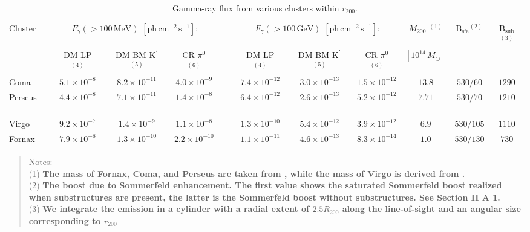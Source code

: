 \documentclass[10pt,aps,pra,reprint,amsmath,amsfonts,amssymb,showpacs,nofootinbib,floatfix]{revtex4-1}
\def\C#1{{\bf #1}}
\newcommand{\rmn}{\mathrm}
\newcommand{\msun}{M_\odot}
\newcommand{\Kp}{\rmn{K}^\prime}
\newcommand{\B}{\rmn{B}}
\newcommand{\rvir}{r_{200}}
\newcommand{\mvir}{M_{200}}
\begin{document}
\begin{table}
\begin{minipage}{2.0\columnwidth}
  \caption{Gamma-ray flux from various clusters within $\rvir$.}
\begin{tabular}{l  c c c  c  c c c c c c}
\hline
\hline
 Cluster &
\multicolumn{3}{c}{$F_{\gamma}(>100\,\rmn{MeV})$ $[\rmn{ph}\,\rmn{cm}^{-2}\,\rmn{s}^{-1}]$:} & &
\multicolumn{3}{c}{$F_{\gamma}(>100\,\rmn{GeV})$ $[\rmn{ph}\,\rmn{cm}^{-2}\,\rmn{s}^{-1}]$:} & 
$\mvir$ $^{(1)}$ & $\B_\rmn{sfe} $$^{(2)}$ &  $\B_\rmn{sub} $$^{(3)}$ \\
         & DM-LP $^{(4)}$ & DM-BM-$\Kp$ $^{(5)}$ & CR-$\pi^0$ $^{(6)}$ 
         & & DM-LP $^{(4)}$ & DM-BM-$\Kp$ $^{(5)}$ & CR-$\pi^0$ $^{(6)}$ & $[10^{14}\,\msun]$ &&  \\
 \hline
 Coma                 & $5.1\times10^{-8}$  & $8.2\times10^{-11}$ & $4.0\times10^{-9}$  
 & \,\,\,\,\,         & $7.4\times10^{-12}$ & $3.0\times10^{-13}$ & $1.5\times10^{-12}$ 
 & $13.8$ & $530/60$  & $1290$ \\
 Perseus \,\,\,\,\,\, & $4.4\times10^{-8}$  & $7.1\times10^{-11}$ & $1.4\times10^{-8}$  
 & \,\,\,\,\,         & $6.4\times10^{-12}$ & $2.6\times10^{-13}$ & $5.2\times10^{-12}$ 
 & $7.71$ & $530/70$  & $1210$ \\
 Virgo                & $9.2\times10^{-7}$  & $1.4\times10^{-9}$ & $1.1\times10^{-8}$  
 & \,\,\,\,\,         & $1.3\times10^{-10}$ & $5.4\times10^{-12}$ & $3.9\times10^{-12}$ 
 & $6.9$  & $530/105$  & $1110$  \\
 Fornax               & $7.9\times10^{-8}$  & $1.3\times10^{-10}$ & $2.2\times10^{-10}$ 
 & \,\,\,\,\,         & $1.1\times10^{-11}$ & $4.6\times10^{-13}$ & $8.3\times10^{-14}$ 
 & $1.0$  & $530/130$  & $730$  \\
\hline
\hline
\end{tabular}
\begin{quote}
  Notes: \\
  (1) \C{The mass of Fornax, Coma, and Perseus are taken from \cite{2002ApJ...567..716R}, 
  while the mass of Virgo is derived from \cite{1984ApJ...281...31T}.}\\
  (2) \C{The boost due to Sommerfeld enhancement. The first value shows the saturated 
  Sommerfeld boost realized when substructures are present, the latter is the Sommerfeld 
  boost without substructures. See Section II A 1.}\\
  (3) \C{We integrate the emission in a cylinder with a radial extent of $2.5
  R_{200}$ along the line-of-sight and an angular size corresponding to $\rvir$
}
\end{quote}
\end{minipage}
\end{table}
\end{document}
